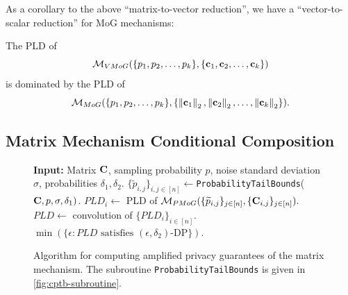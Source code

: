 As a corollary to the above ``matrix-to-vector reduction'', we have a ``vector-to-scalar reduction'' for MoG mechanisms:

\begin{cor}\label{cor:scalardominance}
The PLD of \[\mathcal{M}_{VMoG}(\{p_1, p_2, \ldots, p_k\}, \{\mathbf{c}_1, \mathbf{c}_2, \ldots, \mathbf{c}_k\})\] is dominated by the PLD of \allowbreak \[\mathcal{M}_{MoG}(\{p_1, p_2, \ldots, p_k\}, \{\left\|\mathbf{c}_1\right\|_2, \left\|\mathbf{c}_2\right\|_2, \ldots, \left\|\mathbf{c}_k\right\|_2\}).\]
\end{cor}

\subsection{Matrix Mechanism Conditional Composition}

\begin{figure}
\begin{algorithm}[H]
\caption{\textbf{M}atrix \textbf{M}echanism \textbf{C}onditional \textbf{C}omposition algorithm, \CPTB{}$(\bfC, p, \sigma, \delta_1, \delta_2)$}
\begin{algorithmic}[1]
\State \textbf{Input:} Matrix $\mathbf{C}$, sampling probability $p$, noise standard deviation $\sigma$, probabilities $\delta_1, \delta_2$.
\State $\{\tilde{p}_{i,j}\}_{i, j \in [n]} \leftarrow$\texttt{ProbabilityTailBounds}($\mathbf{C}, p, \sigma, \delta_1)$.\newline{}
\State $PLD_i \leftarrow$ PLD of $\mathcal{M}_{PMoG}(\{\widetilde{p}_{i, j}\}_{j \in [n]}, \{\mathbf{C}_{i, j}\}_{j \in [n]}).$
\EndFor
\State $PLD \leftarrow$ convolution of $\{PLD_i\}_{i \in [n]}$.
\State \Return $\min\left(\{\epsilon: PLD\text{ satisfies }(\epsilon, \delta_2)\text{-DP}\}\right)$.
\end{algorithmic}
\end{algorithm}
\vspace{-1.5em}
\caption{Algorithm \CPTB{} for computing amplified privacy guarantees of the matrix mechanism. The subroutine \texttt{ProbabilityTailBounds} is given in \cref{fig:cptb-subroutine}.}
\label{fig:cptb}
\end{figure}


